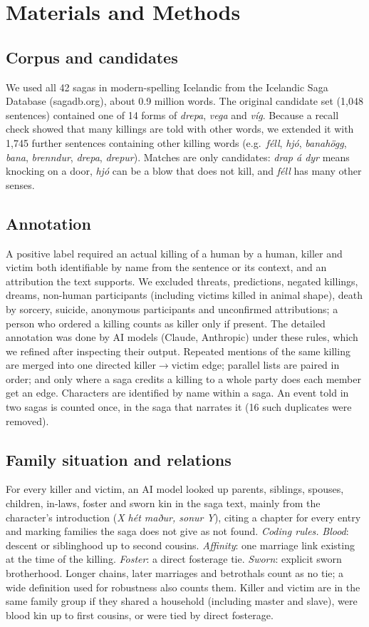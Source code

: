 \documentclass[9pt,twocolumn,twoside]{pnas-new}
\providecommand{\matmethods}[1]{\section*{Materials and Methods}#1}
\begin{document}
\matmethods{
\subsection*{Corpus and candidates}
We used all 42 sagas in modern-spelling Icelandic from the Icelandic Saga Database (sagadb.org), about 0.9 million words. The original candidate set (1{,}048 sentences) contained one of 14 forms of \textit{drepa}, \textit{vega} and \textit{víg}. Because a recall check showed that many killings are told with other words, we extended it with 1{,}745 further sentences containing other killing words (e.g.\ \textit{féll}, \textit{hjó}, \textit{banahögg}, \textit{bana}, \textit{brenndur}, \textit{drepa}, \textit{drepur}). Matches are only candidates: \textit{drap á dyr} means knocking on a door, \textit{hjó} can be a blow that does not kill, and \textit{féll} has many other senses.

\subsection*{Annotation}
A positive label required an actual killing of a human by a human, killer and victim both identifiable by name from the sentence or its context, and an attribution the text supports. We excluded threats, predictions, negated killings, dreams, non-human participants (including victims killed in animal shape), death by sorcery, suicide, anonymous participants and unconfirmed attributions; a person who ordered a killing counts as killer only if present. The detailed annotation was done by AI models (Claude, Anthropic) under these rules, which we refined after inspecting their output. Repeated mentions of the same killing are merged into one directed killer$\rightarrow$victim edge; parallel lists are paired in order; and only where a saga credits a killing to a whole party does each member get an edge. Characters are identified by name within a saga. An event told in two sagas is counted once, in the saga that narrates it (16 such duplicates were removed).

\subsection*{Family situation and relations}
For every killer and victim, an AI model looked up parents, siblings, spouses, children, in-laws, foster and sworn kin in the saga text, mainly from the character's introduction (\textit{X hét maður, sonur Y}), citing a chapter for every entry and marking families the saga does not give as not found. \textit{Coding rules.} \textit{Blood}: descent or siblinghood up to second cousins. \textit{Affinity}: one marriage link existing at the time of the killing. \textit{Foster}: a direct fosterage tie. \textit{Sworn}: explicit sworn brotherhood. Longer chains, later marriages and betrothals count as no tie; a wide definition used for robustness also counts them. Killer and victim are in the same family group if they shared a household (including master and slave), were blood kin up to first cousins, or were tied by direct fosterage.

}
\end{document}

